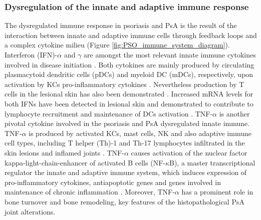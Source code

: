 \subsubsection*{Dysregulation of the innate and adaptive immune response}
The dysregulated immune response in psoriasis and PsA is the result of the interaction between innate and adaptive immune cells through feedback loops and a complex cytokine milieu (Figure \ref{fig:PSO_immune_system_diagram}). Interferon (IFN)-$\alpha$ and $\gamma$ are amongst the most relevant innate immune cytokines involved in disease initiation \parencite{Leanne2009}. Both cytokines are mainly produced by circulating plasmacytoid dendritic cells (pDCs) and myeloid DC (mDCs), respectively, upon activation by KCs pro-inflammatory cytokines \parencite{Perera2012}. Nevertheless production by T cells in the lesional skin has also been demonstrated \parencite{Hijnen2013}. Increased mRNA levels for both IFNs have been detected in lesional skin and demonstrated to contribute to lymphocyte recruitment and maintenance of DCs activation \parencite{Schmid1994}. TNF-$\alpha$ is another pivotal cytokine involved in the psoriasis and PsA dysregulated innate immune. TNF-$\alpha$ is produced by activated KCs, mast cells, NK
 and also adaptive immune cell types, including T helper (Th)-1 and Th-17 lymphocytes infiltrated in the skin lesions and inflamed joints \parencite{Perera2012,Lizzul2005}. TNF-$\alpha$ causes activation of the nuclear factor kappa-light-chain-enhancer of activated B cells (NF-$\kappa$B), a master transcriptional regulator the innate and adaptive immune system, which induces expression of pro-inflammatory cytokines, antiapoptotic genes and genes involved in maintenance of chronic inflammation \parencite{Lizzul2005, Johansen2010}. Moreover, TNF-$\alpha$ has a prominent role in bone turnover and bone remodeling, key features of the histopathological PsA joint alterations\parencite{Mensah2008}. 

